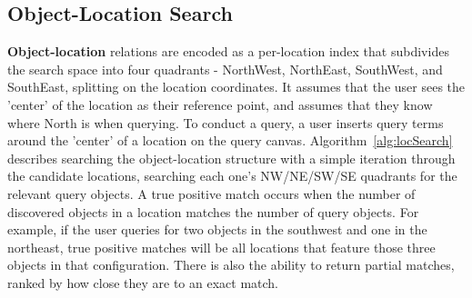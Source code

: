 



\subsection{Object-Location Search}
\textbf{Object-location} relations are encoded as a per-location index that subdivides the search space into four quadrants - NorthWest, NorthEast, SouthWest, and SouthEast, splitting on the location coordinates.
It assumes that the user sees the 'center' of the location as their reference point, and assumes that they know where North is when querying. 
To conduct a query, a user inserts query terms around the 'center' of a location on the query canvas. 
Algorithm~\ref{alg:locSearch} describes searching the object-location structure with a simple iteration through the candidate locations, searching each one's NW/NE/SW/SE quadrants for the relevant query objects.
A true positive match occurs when the number of discovered objects in a location matches the number of query objects.
For example, if the user queries for two objects in the southwest and one in the northeast, true positive matches will be all locations that feature those three objects in that configuration. 
There is also the ability to return partial matches, ranked by how close they are to an exact match.


